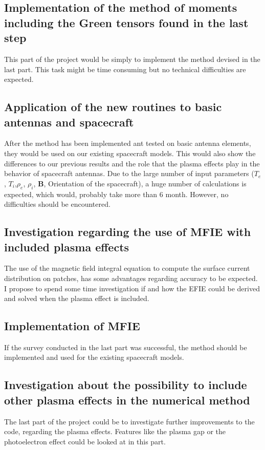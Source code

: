 \documentclass[a4paper,10pt]{article}
\begin{document}
\subsection{Implementation of the method of moments including the Green tensors found in the last step}
This part of the project would be simply to implement the method devised in the last part. This task might be time consuming but no technical difficulties are expected.

\subsection{Application of the new routines to basic antennas and spacecraft}
After the method has been implemented ant tested on basic antenna elements, they would be used on our existing spacecraft models. This would also show the differences to our previous results and the role that the plasma effects play in the behavior of spacecraft antennas. Due to the large number of input parameters ($T_e$, $T_i$,$\rho_e$, $\rho_i$, \textbf{B}, Orientation of the spacecraft), a huge number of calculations is expected, which would, probably take more than 6 month. However, no difficulties should be encountered.

\subsection{Investigation regarding the use of MFIE with included plasma effects}
The use of the magnetic field integral equation to compute the surface current distribution on patches, has some advantages regarding accuracy to be expected. I propose to spend some time investigation if and how the EFIE could be derived and solved when the plasma effect is included.

\subsection{Implementation of MFIE}
If the survey conducted in the last part was successful, the method should be implemented and used for the existing spacecraft models.

\subsection{Investigation about the possibility to include other plasma effects in the numerical method}
The last part of the project could be to investigate further improvements to the code, regarding the plasma effects. Features like the plasma gap or the photoelectron effect could be looked at in this part.

\newpage



\newpage
\listoffigures
\newpage
\listoftables
\end{document}
